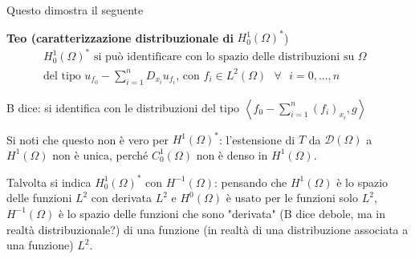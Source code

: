 \documentclass{article}
\begin{document}
Questo dimostra il seguente

\textbf{Teo (caratterizzazione distribuzionale di }$H_{0}^{1}\left( \Omega
\right) ^{\ast }$)\textbf{\ } 
\begin{gather*}
H_{0}^{1}\left( \Omega \right) ^{\ast }\text{ si pu\`{o} identificare con lo
spazio delle distribuzioni su }\Omega \text{ } \\
\text{del tipo }u_{f_{0}}-\sum_{i=1}^{n}D_{x_{i}}u_{f_{i}}\text{, con }%
f_{i}\in L^{2}\left( \Omega \right) \text{ }\forall \text{ }i=0,...,n
\end{gather*}

B dice: si identifica con le distribuzioni del tipo $\left\langle
f_{0}-\sum_{i=1}^{n}\left( f_{i}\right) _{x_{i}},g\right\rangle $

Si noti che questo non \`{e} vero per $H^{1}\left( \Omega \right) ^{\ast }$:
l'estensione di $T$ da $\mathcal{D}\left( \Omega \right) $ a $H^{1}\left(
\Omega \right) $ non \`{e} unica, perch\'{e} $C_{0}^{1}\left( \Omega \right) 
$ non \`{e} denso in $H^{1}\left( \Omega \right) $.

Talvolta si indica $H_{0}^{1}\left( \Omega \right) ^{\ast }$ con $%
H^{-1}\left( \Omega \right) $: pensando che $H^{1}\left( \Omega \right) $ 
\`{e} lo spazio delle funzioni $L^{2}$ con derivata $L^{2}$ e $H^{0}\left(
\Omega \right) $ \`{e} usato per le funzioni solo $L^{2}$, $H^{-1}\left(
\Omega \right) $ \`{e} lo spazio delle funzioni che sono "derivata" (B dice
debole, ma in realt\`{a} distribuzionale?) di una funzione (in realt\`{a} di
una distribuzione associata a una funzione) $L^{2}$.
\end{document}
